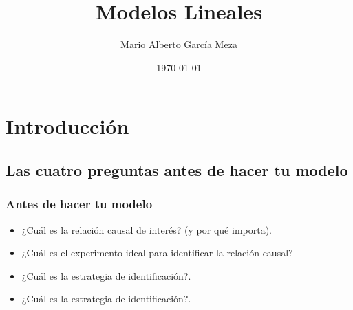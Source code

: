 \documentclass{beamer}
\title{Modelos Lineales}
\author{Mario Alberto García Meza}
\date{\today}
\begin{document}
\frame{\titlepage}

\section[Outline]{}
\frame{\tableofcontents}

\section{Introducción}
\subsection{Las cuatro preguntas antes de hacer tu modelo}
\frame
{
  \frametitle{Antes de hacer tu modelo}

  \begin{itemize}
  \item<1-> ¿Cuál es la relación causal de interés? (y por qué importa).
  \item<2-> ¿Cuál es el experimento ideal para identificar la relación causal?
  \item<3-> ¿Cuál es la estrategia de identificación?.
  \item<4-> ¿Cuál es la estrategia de identificación?.
  \end{itemize}
}
\end{document}
